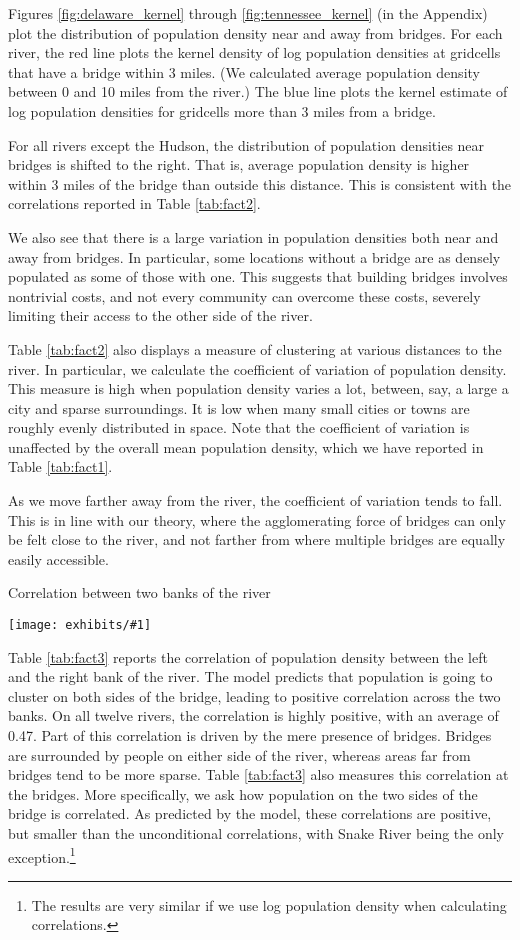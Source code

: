\documentclass[12pt]{article}
\newcommand{\dotable}[2]{\begin{table}[h!]
\caption{#2\label{tab:#1}}
\center %
\texttt{[image: exhibits/\#1]}
\end{table}}
\begin{document}
Figures \ref{fig:delaware_kernel} through \ref{fig:tennessee_kernel} (in the Appendix) plot the distribution of population density near and away from bridges. For each river, the red line plots the kernel density of log population densities at gridcells that have a bridge within 3 miles. (We calculated average population density between 0 and 10 miles from the river.) The blue line plots the kernel estimate of log population densities for gridcells more than 3 miles from a bridge.

For all rivers except the Hudson, the distribution of population densities near bridges is shifted to the right. That is, average population density is higher within 3 miles of the bridge than outside this distance. This is consistent with the correlations reported in Table \ref{tab:fact2}.

We also see that there is a large variation in population densities both near and away from bridges. In particular, some locations without a bridge are as densely populated as some of those with one. This suggests that building bridges involves nontrivial costs, and not every community can overcome these costs, severely limiting their access to the other side of the river.

Table \ref{tab:fact2} also displays a measure of clustering at various distances
to the river. In particular, we calculate the coefficient of variation of population
density. This measure is high when population density varies a lot, between,
say, a large a city and sparse surroundings. It is low when many small
cities or towns are roughly evenly distributed in space. Note that the
coefficient of variation is unaffected by the overall mean population
density, which we have reported in Table \ref{tab:fact1}.

As we move farther away from the river, the coefficient of variation tends
to fall. This is in line with our theory, where the agglomerating force of
bridges can only be felt close to the river, and not farther from where
multiple bridges are equally easily accessible.

\dotable{fact3}{Correlation between two banks of the river}

Table \ref{tab:fact3} reports the correlation of population density between
the left and the right bank of the river. The model predicts that population
is going to cluster on both sides of the bridge, leading to positive
correlation across the two banks. On all twelve rivers, the correlation is
highly positive, with an average of 0.47. Part of this correlation is driven
by the mere presence of bridges. Bridges are surrounded by people on either
side of the river, whereas areas far from bridges tend to be more sparse.
Table \ref{tab:fact3} also measures this correlation at the bridges. More
specifically, we ask how population on the two sides of the bridge is
correlated. As predicted by the model, these correlations are positive, but
smaller than the unconditional correlations, with Snake River being the only exception.\footnote{%
The results are very similar if we use log population density when
calculating correlations.}
\end{document}

